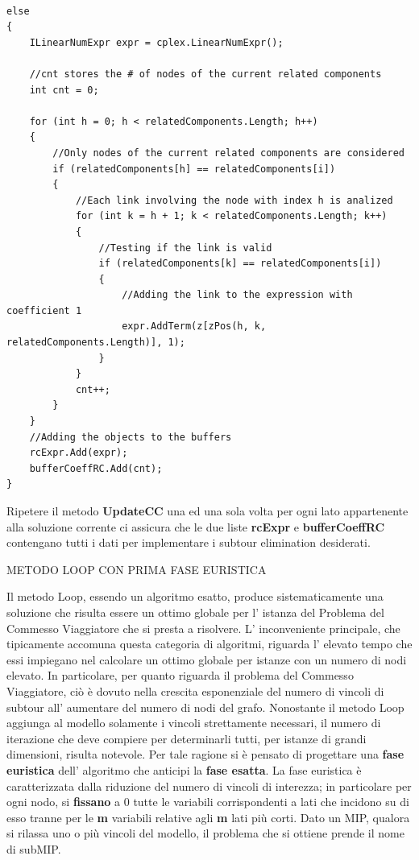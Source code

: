 \documentclass[11pt]{article}
\begin{document}
\begin{lstlisting}

else
{
    ILinearNumExpr expr = cplex.LinearNumExpr();

    //cnt stores the # of nodes of the current related components
    int cnt = 0;

    for (int h = 0; h < relatedComponents.Length; h++)
    {
        //Only nodes of the current related components are considered
        if (relatedComponents[h] == relatedComponents[i])
        {
            //Each link involving the node with index h is analized
            for (int k = h + 1; k < relatedComponents.Length; k++)
            {
                //Testing if the link is valid
                if (relatedComponents[k] == relatedComponents[i])
                {
                    //Adding the link to the expression with coefficient 1
                    expr.AddTerm(z[zPos(h, k, relatedComponents.Length)], 1);
                }
            }
            cnt++;
        }
    }
    //Adding the objects to the buffers
    rcExpr.Add(expr);
    bufferCoeffRC.Add(cnt);
}

\end{lstlisting}

Ripetere il metodo \textbf{UpdateCC} una ed una sola volta per ogni lato appartenente alla soluzione corrente ci assicura che le due liste \textbf{rcExpr} e \textbf{bufferCoeffRC} contengano tutti i dati per implementare i subtour elimination desiderati.


\vspace{2\baselineskip} 
METODO LOOP CON PRIMA FASE EURISTICA 
\vspace{2\baselineskip} 

Il metodo Loop, essendo un algoritmo esatto, produce sistematicamente una soluzione che risulta essere un ottimo globale per l' istanza del Problema del Commesso Viaggiatore che si presta a risolvere. L' inconveniente principale, che tipicamente accomuna questa categoria di algoritmi, riguarda l' elevato tempo che essi impiegano nel calcolare un ottimo globale per istanze con un numero di nodi elevato. In particolare, per quanto riguarda il problema del Commesso Viaggiatore, ciò è dovuto nella crescita esponenziale del numero di vincoli di subtour all' aumentare del numero di nodi del grafo. Nonostante il metodo Loop aggiunga al modello solamente i vincoli strettamente necessari, il numero di iterazione che deve compiere per determinarli tutti, per istanze di grandi dimensioni, risulta notevole. Per tale ragione si è pensato di progettare una \textbf{fase euristica} dell' algoritmo che anticipi la \textbf{fase esatta}. La fase euristica è caratterizzata dalla riduzione del numero di vincoli di interezza; in particolare per ogni nodo, si \textbf{fissano} a 0 tutte le variabili corrispondenti a lati che incidono su di esso tranne per le \textbf{m} variabili relative agli \textbf{m} lati più corti. Dato un MIP, qualora si rilassa uno o più vincoli del modello, il problema che si ottiene prende il nome di subMIP.
\end{document}
